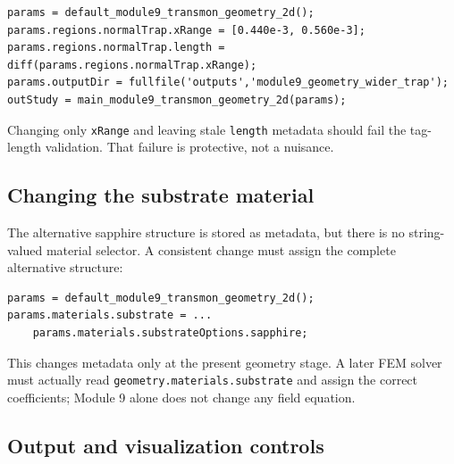 \documentclass[11pt]{article}
\begin{document}
\begin{lstlisting}[style=projectmatlab]
params = default_module9_transmon_geometry_2d();
params.regions.normalTrap.xRange = [0.440e-3, 0.560e-3];
params.regions.normalTrap.length = diff(params.regions.normalTrap.xRange);
params.outputDir = fullfile('outputs','module9_geometry_wider_trap');
outStudy = main_module9_transmon_geometry_2d(params);
\end{lstlisting}

Changing only \texttt{xRange} and leaving stale \texttt{length} metadata should fail the tag-length validation. That failure is protective, not a nuisance.

\subsection{Changing the substrate material}

The alternative sapphire structure is stored as metadata, but there is no string-valued material selector. A consistent change must assign the complete alternative structure:

\begin{lstlisting}[style=projectmatlab]
params = default_module9_transmon_geometry_2d();
params.materials.substrate = ...
    params.materials.substrateOptions.sapphire;
\end{lstlisting}

This changes metadata only at the present geometry stage. A later FEM solver must actually read \texttt{geometry.materials.substrate} and assign the correct coefficients; Module 9 alone does not change any field equation.

\subsection{Output and visualization controls}
\end{document}
